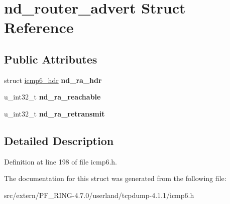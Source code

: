 \hypertarget{structnd__router__advert}{
\section{nd\_\-router\_\-advert Struct Reference}
\label{structnd__router__advert}
}
\subsection*{Public Attributes}
\begin{DoxyCompactItemize}
\item 
\hypertarget{structnd__router__advert_a0f8834d0d8b010e6d42ae7bd6b80783e}{
struct \hyperlink{structicmp6__hdr}{icmp6\_\-hdr} {\bfseries nd\_\-ra\_\-hdr}}
\label{structnd__router__advert_a0f8834d0d8b010e6d42ae7bd6b80783e}

\item 
\hypertarget{structnd__router__advert_a14fae55984fb001f18e974d9e4e58c04}{
u\_\-int32\_\-t {\bfseries nd\_\-ra\_\-reachable}}
\label{structnd__router__advert_a14fae55984fb001f18e974d9e4e58c04}

\item 
\hypertarget{structnd__router__advert_a827dec3e491faf1a6bff5fe18026fef2}{
u\_\-int32\_\-t {\bfseries nd\_\-ra\_\-retransmit}}
\label{structnd__router__advert_a827dec3e491faf1a6bff5fe18026fef2}

\end{DoxyCompactItemize}


\subsection{Detailed Description}


Definition at line 198 of file icmp6.h.



The documentation for this struct was generated from the following file:\begin{DoxyCompactItemize}
\item 
src/extern/PF\_\-RING-\/4.7.0/userland/tcpdump-\/4.1.1/icmp6.h\end{DoxyCompactItemize}
